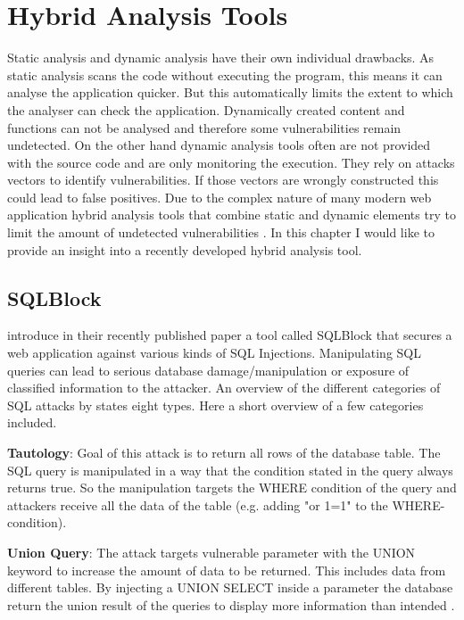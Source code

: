 \section{Hybrid Analysis Tools}
Static analysis and dynamic analysis have their own individual drawbacks. As static analysis scans the code without executing the program, this means it can analyse the application quicker. But this automatically limits the extent to which the analyser can check the application. Dynamically created content and functions can not be analysed and therefore some vulnerabilities remain undetected. On the other hand dynamic analysis tools often are not provided with the source code and are only monitoring the execution. They rely on attacks vectors to identify vulnerabilities. If those vectors are wrongly constructed this could lead to false positives.
Due to the complex nature of many modern web application hybrid analysis tools that combine static and dynamic elements try to limit the amount of undetected vulnerabilities \autocite[]{Araujo2018, Jahanshahi2018}. In this chapter I would like to provide an insight into a recently developed hybrid analysis tool.\newline


\subsection{SQLBlock}

\textcite[]{Jahanshahi2018} introduce in their recently published paper a tool called SQLBlock that secures a web application against various kinds of SQL Injections. Manipulating SQL queries can lead to serious database damage/manipulation or exposure of classified information to the attacker. An overview of the different categories of SQL attacks by \textcite[3ff.]{Halfond2008} states eight types. Here a short overview of a few categories included.\newline


\textbf{Tautology}: Goal of this attack is to return all rows of the database table. The SQL query is manipulated in a way that the condition stated in the query always returns true. So the manipulation targets the WHERE condition of the query and attackers receive all the data of the table (e.g. adding "or 1=1" to the WHERE-condition)\autocite[3]{Halfond2008}.\newline


\textbf{Union Query}: The attack targets vulnerable parameter with the UNION keyword to increase the amount of data to be returned. This includes data from different tables. By injecting a UNION SELECT inside a parameter the database return the union result of the queries to display more information than intended \autocite[4]{Halfond2008}.\newline


